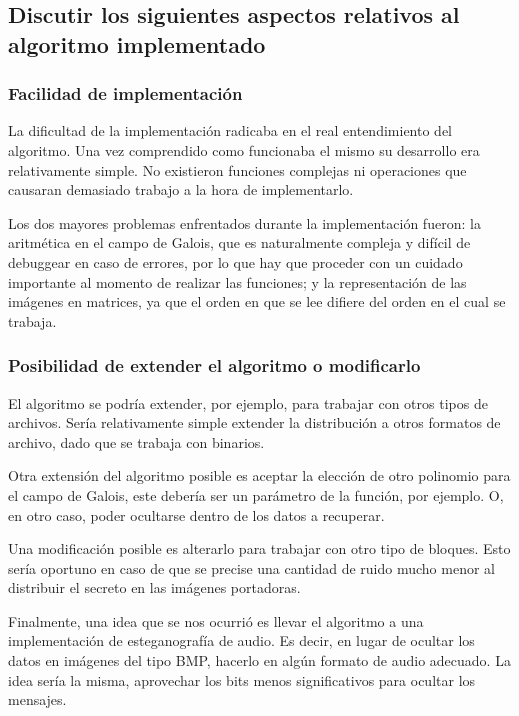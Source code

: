 \documentclass[11pt]{scrartcl} %
\begin{document}
\subsection{Discutir los siguientes aspectos relativos al algoritmo implementado}
\subsubsection{Facilidad de implementación}

La dificultad de la implementación radicaba en el real entendimiento del algoritmo. Una vez comprendido como funcionaba el mismo su desarrollo era relativamente simple. No existieron funciones complejas ni operaciones que causaran demasiado trabajo a la hora de implementarlo.

Los dos mayores problemas enfrentados durante la implementación fueron: la aritmética en el campo de Galois, que es naturalmente compleja y difícil de debuggear en caso de errores, por lo que hay que proceder con un cuidado importante al momento de realizar las funciones; y la representación de las imágenes en matrices, ya que el orden en que se lee difiere del orden en el cual se trabaja.

\subsubsection{Posibilidad de extender el algoritmo o modificarlo}

El algoritmo se podría extender, por ejemplo, para trabajar con otros tipos de archivos. Sería relativamente simple extender la distribución a otros formatos de archivo, dado que se trabaja con binarios.

Otra extensión del algoritmo posible es aceptar la elección de otro polinomio para el campo de Galois, este debería ser un parámetro de la función, por ejemplo. O, en otro caso, poder ocultarse dentro de los datos a recuperar.

Una modificación posible es alterarlo para trabajar con otro tipo de bloques. Esto sería oportuno en caso de que se precise una cantidad de ruido mucho menor al distribuir el secreto en las imágenes portadoras.

Finalmente, una idea que se nos ocurrió es llevar el algoritmo a una implementación de esteganografía de audio. Es decir, en lugar de ocultar los datos en imágenes del tipo BMP, hacerlo en algún formato de audio adecuado. La idea sería la misma, aprovechar los bits menos significativos para ocultar los mensajes.
\end{document}
